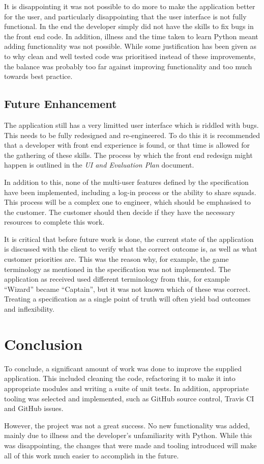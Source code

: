 \documentclass[a4paper,12pt]{article}
\begin{document}
It is disappointing it was not possible to do more to make the application better for the user, and particularly disappointing that the user interface is not fully functional. In the end the developer simply did not have the skills to fix bugs in the front end code. In addition, illness and the time taken to learn Python meant adding functionality was not possible. While some justification has been given as to why clean and well tested code was prioritised instead of these improvements, the balance was probably too far against improving functionality and too much towards best practice. 

\subsection{Future Enhancement}

The application still has a very limitted user interface which is riddled with bugs. This needs to be fully redesigned and re-engineered. To do this it is recommended that a developer with front end experience is found, or that time is allowed for the gathering of these skills. The process by which the front end redesign might happen is outlined in the \emph{UI	and	Evaluation	Plan} document.

In addition to this, none of the multi-user features defined by the specification have been implemented, including a log-in process or the ability to share squads. This process will be a complex one to engineer, which should be emphasised to the customer. The customer should then decide if they have the necessary resources to complete this work.

It is critical that before future work is done, the current state of the application is discussed with the client to verify what the correct outcome is, as well as what customer priorities are. This was the reason why, for example, the game terminology as mentioned in the specification was not implemented. The application as received used different terminology from this, for example ``Wizard'' became ``Captain'', but it was not known which of these was correct. Treating a specification as a single point of truth will often yield bad outcomes and inflexibility. 

\section{Conclusion}
To conclude, a significant amount of work was done to improve the supplied application. This included cleaning the code, refactoring it to make it into appropriate modules and writing a suite of unit tests. In addition, appropriate tooling was selected and implemented, such as GitHub source control, Travis CI and GitHub issues.

However, the project was not a great success. No new functionality was added, mainly due to illness and the developer's unfamiliarity with Python. While this was disappointing, the changes that were made and tooling introduced will make all of this work much easier to accomplish in the future.
\end{document}
